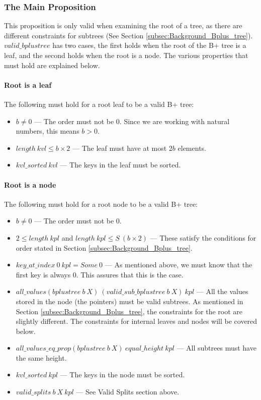 \subsubsection{The Main Proposition}
This proposition is only valid when examining the root of a tree, as there are different constraints for subtrees (See Section \ref{subsec:Background_Bplus_tree}). $valid\_bplustree$ has two cases, the first holds when the root of the B+ tree is a leaf, and the second holds when the root is a node. The various properties that must hold are explained below.

\paragraph{Root is a leaf}
The following must hold for a root leaf to be a valid B+ tree:
\label{valid_root_is_a_leaf}
\begin{itemize}
\item $b \neq 0$ --- The order must not be 0. Since we are working with natural numbers, this means $b > 0$.
\item $length\ kvl \leq b \times 2 $ --- The leaf must have at most $2b$ elements.
\item $kvl\_sorted\ kvl$ --- The keys in the leaf must be sorted.
\end{itemize}

\paragraph{Root is a node}
The following must hold for a root node to be a valid B+ tree:
\label{valid_root_is_a_node}
\begin{itemize}
\item $b \neq 0$ --- The order must not be 0.
\item $2 \leq length\ kpl$ and $length\ kpl \leq S\ (b \times 2)$ --- These satisfy the conditions for order stated in Section \ref{subsec:Background_Bplus_tree}.
\item $key\_at\_index\ 0\ kpl = Some\ 0$ --- As mentioned above, we must know that the first key is always 0. This assures that this is the case.
\item $all\_values (bplustree\ b\ X)\ (valid\_sub\_bplustree\ b\ X)\ kpl$ --- All the values stored in the node (the pointers) must be valid subtrees. As mentioned in Section \ref{subsec:Background_Bplus_tree}, the constraints for the root are slightly different. The constraints for internal leaves and nodes will be covered below.
\item $all\_values\_eq\_prop (bplustree\ b\ X)\ equal\_height\ kpl$ --- All subtrees must have the same height.
\item $kvl\_sorted\ kpl$ --- The keys in the node must be sorted.
\item $valid\_splits\ b \ X\ kpl$ --- See Valid Splits section above.
\end{itemize}

